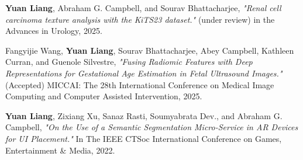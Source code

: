 \documentclass[final,british,a4paper,12pt]{phdthesis}
\begin{document}
\begin{listofpublications}
















\textbf{Yuan Liang}, Abraham G. Campbell, and Sourav Bhattacharjee, \textit{"Renal cell carcinoma texture analysis with the KiTS23 dataset."} (under review) in the Advances in Urology, 2025.

\vspace{10mm}
Fangyijie Wang, \textbf{Yuan Liang}, Sourav Bhattacharjee, Abey Campbell, Kathleen Curran, and Guenole Silvestre, \textit{"Fusing Radiomic Features with Deep Representations for Gestational Age Estimation in Fetal Ultrasound Images."} (Accepted) MICCAI: The 28th International Conference on Medical Image Computing and Computer Assisted Intervention, 2025.

\vspace{10mm}

\textbf{Yuan Liang}, Zixiang Xu, Sanaz Rasti, Soumyabrata Dev., and Abraham G. Campbell, \textit{"On the Use of a Semantic Segmentation Micro-Service in AR Devices for UI Placement."}  In The IEEE CTSoc International Conference on Games, Entertainment \& Media, 2022.

\vspace{10mm}


\end{listofpublications}
\end{document}
